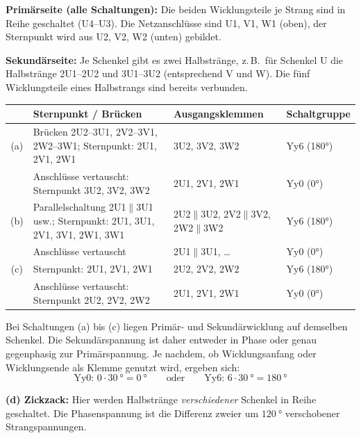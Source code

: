\textbf{Primärseite (alle Schaltungen):} Die beiden Wicklungsteile je Strang sind in Reihe geschaltet (U4--U3). Die Netzanschlüsse sind U1, V1, W1 (oben), der Sternpunkt wird aus U2, V2, W2 (unten) gebildet.

\textbf{Sekundärseite:} Je Schenkel gibt es zwei Halbstränge, z.\,B.\ für Schenkel U die Halbstränge 2U1--2U2 und 3U1--3U2 (entsprechend V und W). Die fünf Wicklungsteile eines Halbstrangs sind bereits verbunden.

\begin{center}
\small
\renewcommand{\arraystretch}{1.25}
\begin{tabular}{@{}cp{4.3cm}p{4.3cm}p{2.6cm}@{}}
\toprule
 & Sternpunkt / Brücken & Ausgangsklemmen & Schaltgruppe\\
\midrule
(a) & Brücken 2U2--3U1, 2V2--3V1, 2W2--3W1; Sternpunkt: 2U1, 2V1, 2W1 & 3U2, 3V2, 3W2 & Yy6 (180°)\\
    & Anschlüsse vertauscht: Sternpunkt 3U2, 3V2, 3W2 & 2U1, 2V1, 2W1 & Yy0 (0°)\\
\midrule
(b) & Parallelschaltung 2U1$\parallel$3U1 usw.; Sternpunkt: 2U1, 3U1, 2V1, 3V1, 2W1, 3W1 & 2U2$\parallel$3U2, 2V2$\parallel$3V2, 2W2$\parallel$3W2 & Yy6 (180°)\\
    & Anschlüsse vertauscht & 2U1$\parallel$3U1, \ldots & Yy0 (0°)\\
\midrule
(c) & Sternpunkt: 2U1, 2V1, 2W1 & 2U2, 2V2, 2W2 & Yy6 (180°)\\
    & Anschlüsse vertauscht: Sternpunkt 2U2, 2V2, 2W2 & 2U1, 2V1, 2W1 & Yy0 (0°)\\
\bottomrule
\end{tabular}
\end{center}

Bei Schaltungen (a) bis (c) liegen Primär- und Sekundärwicklung auf demselben Schenkel. Die Sekundärspannung ist daher entweder in Phase oder genau gegenphasig zur Primärspannung. Je nachdem, ob Wicklungsanfang oder Wicklungsende als Klemme genutzt wird, ergeben sich:
\begin{equation*}
  \text{Yy0: } 0\cdot\SI{30}{\degree} = \SI{0}{\degree}
  \qquad\text{oder}\qquad
  \text{Yy6: } 6\cdot\SI{30}{\degree} = \SI{180}{\degree}
\end{equation*}

\textbf{(d) Zickzack:} Hier werden Halbstränge \emph{verschiedener} Schenkel in Reihe geschaltet. Die Phasenspannung ist die Differenz zweier um $\SI{120}{\degree}$ verschobener Strangspannungen.

